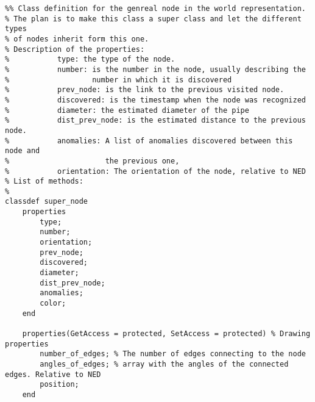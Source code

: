 \begin{lstlisting}
%% Class definition for the genreal node in the world representation. 
% The plan is to make this class a super class and let the different types
% of nodes inherit form this one.
% Description of the properties:
%           type: the type of the node.
%           number: is the number in the node, usually describing the
%                   number in which it is discovered
%           prev_node: is the link to the previous visited node.
%           discovered: is the timestamp when the node was recognized
%           diameter: the estimated diameter of the pipe
%           dist_prev_node: is the estimated distance to the previous node.
%           anomalies: A list of anomalies discovered between this node and
%                      the previous one,
%           orientation: The orientation of the node, relative to NED
% List of methods:
%           
classdef super_node
    properties
        type;
        number;
        orientation;
        prev_node;
        discovered;
        diameter;
        dist_prev_node;
        anomalies;
        color;
    end
    
    properties(GetAccess = protected, SetAccess = protected) % Drawing properties
        number_of_edges; % The number of edges connecting to the node
        angles_of_edges; % array with the angles of the connected edges. Relative to NED
        position;
    end
    

\end{lstlisting}
